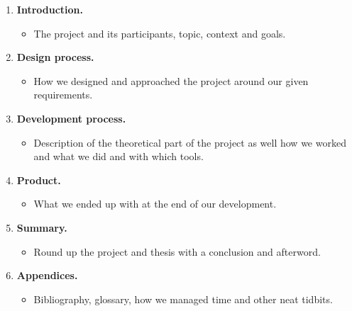 \begin{enumerate}
	\item \textbf{Introduction.}
	\begin{itemize}
		\item[]
			The project and its participants, topic, context and
			goals.
	\end{itemize}

	\item \textbf{Design process.}
	\begin{itemize}
		\item[]
			How we designed and approached the project around our
			given requirements.
	\end{itemize}
	
	\item \textbf{Development process.}
	\begin{itemize}
		\item[]
			Description of the theoretical part of the project as
			well how we worked and what we did and with which tools.
	\end{itemize}
	
	\item \textbf{Product.}
	\begin{itemize}
		\item[]
			What we ended up with at the end of our development.
	\end{itemize}
	
	\item \textbf{Summary.}
	\begin{itemize}
		\item[]
			Round up the project and thesis with a conclusion and
			afterword.
	\end{itemize}
	
	\item \textbf{Appendices.}
	\begin{itemize}
		\item[]
			Bibliography, glossary, how we managed time and other
			neat tidbits.
	\end{itemize}
\end{enumerate}